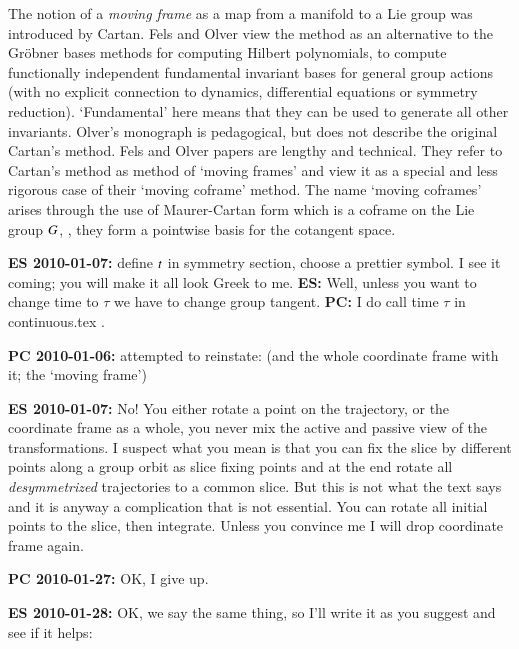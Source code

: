 The notion of a {\em moving frame} as a map from a manifold
to a Lie group was introduced by Cartan. Fels
and Olver view the method as an alternative to the Gr\"obner
bases methods for computing Hilbert polynomials, to compute
functionally independent fundamental invariant bases for
general group actions (with no explicit connection to
dynamics, differential equations or symmetry reduction).
`Fundamental' here means that they can be used to generate
all other invariants. Olver's monograph is
pedagogical, but does not describe the original Cartan's
method. Fels and Olver papers are
lengthy and technical. They refer to Cartan's method as
method of `moving frames' and view it as a special and less
rigorous case of their `moving coframe' method. The name
`moving coframes' arises through the use of Maurer-Cartan
form which is a coframe on the Lie group $G$, \ie, they
form a pointwise basis for the cotangent space.

{\bf ES 2010-01-07:}
define $t$ in symmetry section, choose a prettier
symbol. I see it coming; you will make it all look Greek to
me. {\bf ES:} Well, unless 	you want to change time to $\tau$
we have to change 	group tangent. {\bf PC:} I do call time
$\tau$ in continuous.tex .

{\bf PC 2010-01-06:} attempted to reinstate: (and the whole
coordinate frame with it; the `moving frame')

{\bf ES 2010-01-07:} No! You either rotate a point on the trajectory, or the coordinate
	frame as a whole, you never mix the active and passive view of the transformations.
	I suspect what you mean is that you can fix the slice by different points along
	a group orbit as slice fixing points and at the end rotate all \emph{desymmetrized} trajectories
	to a common slice. But this is not what the text says and it is anyway a complication
	that is not essential. You can rotate all initial points to the slice, then integrate.
	Unless you convince me I will drop coordinate frame again.

{\bf PC 2010-01-27:} OK, I give up.

{\bf ES 2010-01-28:} OK, we say the same thing, so I'll write it as you suggest and see
			if it helps:

